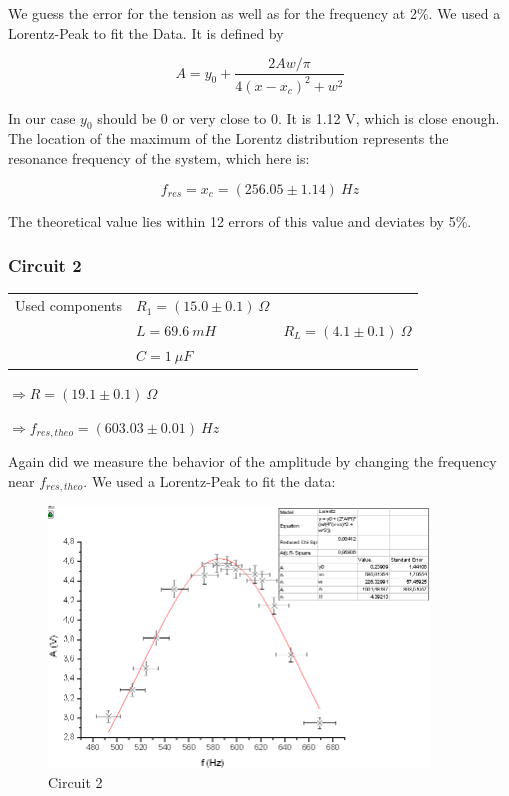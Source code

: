 We guess the error for the tension as well as for the frequency at 2\%. We used a Lorentz-Peak to fit the Data. It is defined by 

$$ A = y_0 + \frac{2Aw/\pi}{4(x-x_c)^2 + w^2} $$

In our case $y_0$ should be 0 or very close to 0. It is 1.12 V, which is close enough. The location of the maximum of the Lorentz distribution represents the resonance frequency of the system, which here is:

$$\boxed{f_{res} = x_c = (256.05 \pm 1.14)\ Hz}$$

The theoretical value lies within 12 errors of this value and deviates by 5\%.

\subsubsection{Circuit 2}

\begin{tabular}{l l l}
Used components & $R_1 = (15.0 \pm 0.1)\ \Omega$ & \\
 & $L=69.6\ mH$ & $R_L = (4.1 \pm 0.1)\ \Omega$\\
 & $C=1\ \mu F$ & \\
\end{tabular}

$\Rightarrow R = (19.1 \pm 0.1)\ \Omega$

$\Rightarrow f_{res,theo} = (603.03 \pm 0.01)\ Hz$

Again did we measure the behavior of the amplitude by changing the frequency near $f_{res,theo}$. We used a Lorentz-Peak to fit the data: 

\begin{figure}[H]
\centering \includegraphics[width=0.9\textwidth]{Bilder/1b.png}
\caption{Circuit 2}
\end{figure}

